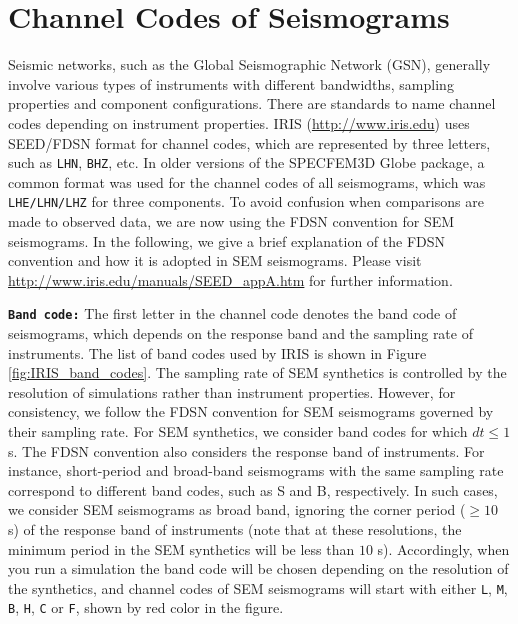 \chapter{Channel Codes of Seismograms}\label{cha:channel-codes}

Seismic networks, such as the Global Seismographic Network (GSN), generally involve various types of instruments with different
bandwidths, sampling properties and component configurations.
There are standards to name channel codes depending on instrument properties. IRIS (\url{http://www.iris.edu}) uses SEED/FDSN format
for channel codes, which are represented by three letters, such as \texttt{LHN}, \texttt{BHZ}, etc. In older versions of the
SPECFEM3D Globe package, a common format was used for the channel codes of all seismograms, which was \texttt{LHE/LHN/LHZ}
for three components. To avoid confusion when comparisons are made to observed data, we are now using the FDSN convention
for SEM seismograms. In the following, we give a brief explanation of the FDSN convention and how it is adopted in SEM seismograms.
Please visit \url{http://www.iris.edu/manuals/SEED_appA.htm} for further information.\newline


\noindent
\textbf{\texttt{Band code:}} The first letter in the channel code denotes the band code of seismograms, which depends on the response band and the sampling rate of instruments. The list of band codes used by IRIS is shown in Figure \ref{fig:IRIS_band_codes}. The sampling rate of SEM synthetics is controlled by the resolution of simulations rather than instrument properties. However, for consistency, we follow the FDSN convention for SEM seismograms governed by their sampling rate. For SEM synthetics, we consider band codes for which $dt \leq 1$ s. The FDSN convention also considers the response band of instruments. For instance, short-period and broad-band seismograms with the same sampling rate correspond to different band codes, such as S and B, respectively. In such cases, we consider SEM seismograms as broad band, ignoring the corner period ($\geq 10$ s) of the response band of instruments (note that at these resolutions, the minimum period in the SEM synthetics will be less than $10$ s).
Accordingly, when you run a simulation the band code will be chosen depending on the resolution of the synthetics, and channel codes of SEM seismograms will start with either \texttt{L}, \texttt{M}, \texttt{B}, \texttt{H}, \texttt{C} or \texttt{F}, shown by red color in the figure.\newline

